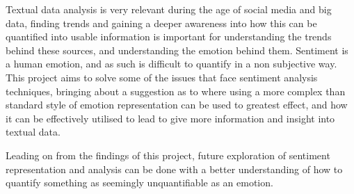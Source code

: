 \documentclass[11pt]{article}
\begin{document}
Textual data analysis is very relevant during the age of social media and big data, finding trends and gaining a deeper awareness into how this can be quantified into usable information is important for understanding the trends behind these sources, and understanding the emotion behind them. Sentiment is a human emotion, and as such is difficult to quantify in a non subjective way. This project aims to solve some of the issues that face sentiment analysis techniques, bringing about a suggestion as to where using a more complex than standard style of emotion representation can be used to greatest effect, and how it can be effectively utilised to lead to give more information and insight into textual data.

Leading on from the findings of this project, future exploration of sentiment representation and analysis can be done with a better understanding of how to quantify something as seemingly unquantifiable as an emotion.

\pagebreak






\end{document}
